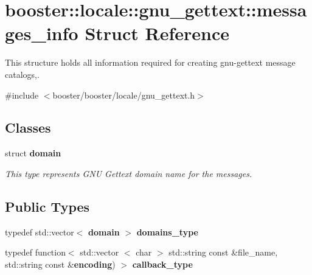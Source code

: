 \section{booster\-:\-:locale\-:\-:gnu\-\_\-gettext\-:\-:messages\-\_\-info \-Struct \-Reference}
\label{structbooster_1_1locale_1_1gnu__gettext_1_1messages__info}


\-This structure holds all information required for creating gnu-\/gettext message catalogs,.  




{\ttfamily \#include $<$booster/booster/locale/gnu\-\_\-gettext.\-h$>$}

\subsection*{\-Classes}
\begin{DoxyCompactItemize}
\item 
struct {\bf domain}
\begin{DoxyCompactList}\small\item\em \-This type represents \-G\-N\-U \-Gettext domain name for the messages. \end{DoxyCompactList}\end{DoxyCompactItemize}
\subsection*{\-Public \-Types}
\begin{DoxyCompactItemize}
\item 
typedef std\-::vector$<$ {\bf domain} $>$ {\bf domains\-\_\-type}
\item 
typedef function$<$ std\-::vector\*
$<$ char $>$ std\-::string const \*
\&file\-\_\-name, std\-::string const \*
\&{\bf encoding}) $>$ {\bf callback\-\_\-type}
\end{DoxyCompactItemize}
